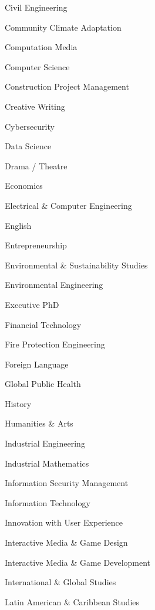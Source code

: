 \begin{CompactItemize}[leftmargin = *]
\begin{CompactItemize}
\begin{CompactItemize}
\begin{CompactItemize}
                \item Civil Engineering
                \item Community Climate Adaptation
                \item Computation Media
                \item Computer Science
                \item Construction Project Management
                \item Creative Writing
                \item Cybersecurity
                \item Data Science
                \item Drama / Theatre
                \item Economics
                \item Electrical \& Computer Engineering
                \item English
                \item Entrepreneurship
                \item Environmental \& Sustainability Studies
                \item Environmental Engineering
                \item Executive PhD
                \item Financial Technology
                \item Fire Protection Engineering
                \item Foreign Language
                \item Global Public Health
                \item History
                \item Humanities \& Arts
                \item Industrial Engineering
                \item Industrial Mathematics
                \item Information Security Management
                \item Information Technology
                \item Innovation with User Experience
                \item Interactive Media \& Game Design
                \item Interactive Media \& Game Development
                \item International \& Global Studies
                \item Latin American \& Caribbean Studies

\end{CompactItemize}
\end{CompactItemize}
\end{CompactItemize}
\end{CompactItemize}
